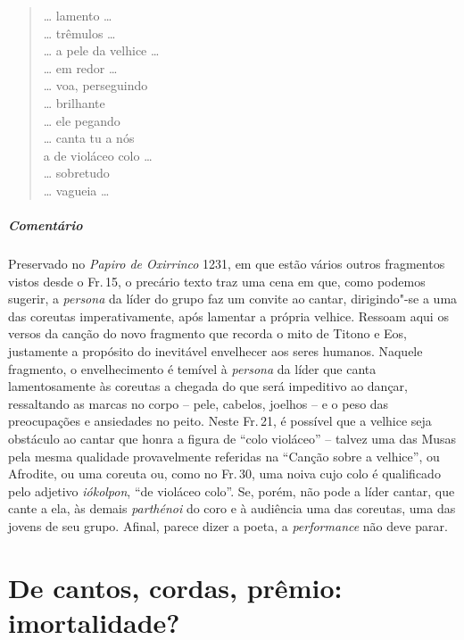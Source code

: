 {\begin{verse}
\ldots{} lamento \ldots{}\\
\ldots{} trêmulos \ldots{}\\
\ldots{} a pele da velhice \ldots{}\\
\ldots{} em redor \ldots{}\\
\ldots{} voa, perseguindo\\
\ldots{} brilhante\\
\ldots{} ele pegando\\
\ldots{} canta tu a nós\\
a de violáceo colo \ldots{}\\
\ldots{} sobretudo\\
\ldots{} vagueia \ldots{}
\end{verse}

\medskip

{\paragraph{Comentário} Preservado no \textit{Papiro de Oxirrinco} 1231, em que estão vários
outros fragmentos vistos desde o Fr.\,15, o precário texto traz uma
cena em que, como podemos sugerir, a \textit{persona} da líder do grupo
faz um convite ao cantar, dirigindo"-se a uma das coreutas
imperativamente, após lamentar a própria velhice. Ressoam aqui os versos
da canção do novo fragmento que recorda o mito de Titono e Eos,
justamente a propósito do inevitável envelhecer aos seres humanos.
Naquele fragmento, o envelhecimento é temível à \textit{persona} da líder que canta lamentosamente às
coreutas a chegada do que será impeditivo ao dançar, ressaltando as
marcas no corpo -- pele, cabelos, joelhos -- e o peso das
preocupações e ansiedades no peito. Neste Fr.\,21, é possível que a
velhice seja obstáculo ao cantar que honra a figura de ``colo violáceo''
-- talvez uma das Musas pela mesma qualidade provavelmente referidas na
``Canção sobre a velhice'', ou Afrodite, ou uma coreuta
ou, como no Fr.\,30, uma noiva cujo colo é qualificado pelo adjetivo \textit{iókolpon}, ``de violáceo colo''. Se, porém, não pode a líder cantar, que
cante a ela, às demais \textit{parthénoi} do coro e à audiência uma das
coreutas, uma das jovens de seu grupo. Afinal, parece dizer a poeta, a
\textit{performance} não deve parar.}



\chapter{De cantos, cordas, prêmio: imortalidade?}

}
